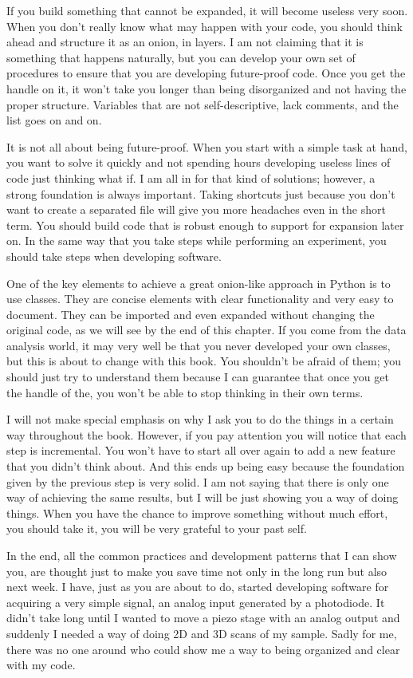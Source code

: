 If you build something that cannot be expanded, it will become useless very soon. When you don’t really know what may happen with your code, you should think ahead and structure it as an onion, in layers. I am not claiming that it is something that happens naturally, but you can develop your own set of procedures to ensure that you are developing future-proof code. Once you get the handle on it, it won’t take you longer than being disorganized and not having the proper structure. Variables that are not self-descriptive, lack comments, and the list goes on and on.

It is not all about being future-proof. When you start with a simple task at hand, you want to solve it quickly and not spending hours developing useless lines of code just thinking what if. I am all in for that kind of solutions; however, a strong foundation is always important. Taking shortcuts just because you don’t want to create a separated file will give you more headaches even in the short term. You should build code that is robust enough to support for expansion later on. In the same way that you take steps while performing an experiment, you should take steps when developing software.

One of the key elements to achieve a great onion-like approach in Python is to use classes. They are concise elements with clear functionality and very easy to document. They can be imported and even expanded without changing the original code, as we will see by the end of this chapter. If you come from the data analysis world, it may very well be that you never developed your own classes, but this is about to change with this book. You shouldn’t be afraid of them; you should just try to understand them because I can guarantee that once you get the handle of the, you won’t be able to stop thinking in their own terms.

I will not make special emphasis on why I ask you to do the things in a certain way throughout the book. However, if you pay attention you will notice that each step is incremental. You won’t have to start all over again to add a new feature that you didn’t think about. And this ends up being easy because the foundation given by the previous step is very solid. I am not saying that there is only one way of achieving the same results, but I will be just showing you a way of doing things. When you have the chance to improve something without much effort, you should take it, you will be very grateful to your past self.

In the end, all the common practices and development patterns that I can show you, are thought just to make you save time not only in the long run but also next week. I have, just as you are about to do, started developing software for acquiring a very simple signal, an analog input generated by a photodiode. It didn’t take long until I wanted to move a piezo stage with an analog output and suddenly I needed a way of doing 2D and 3D scans of my sample. Sadly for me, there was no one around who could show me a way to being organized and clear with my code.

